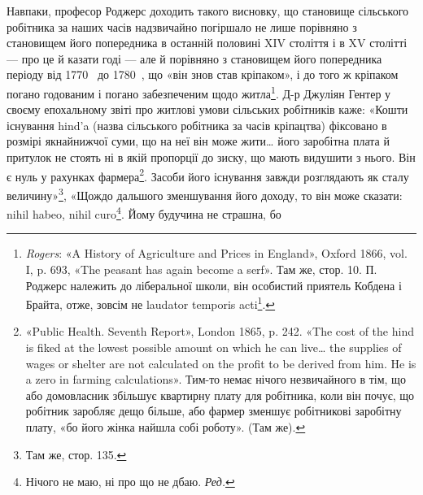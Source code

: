Навпаки, професор Роджерс доходить такого висновку, що
становище сільського робітника за наших часів надзвичайно
погіршало не лише порівняно з становищем його попередника
в останній половині XIV століття і в XV столітті — про це й
казати годі — але й порівняно з становищем його попередника
періоду від 1770~ до 1780~, що «він знов став кріпаком», і
до того ж кріпаком погано годованим і погано забезпеченим щодо
житла\footnote{
\emph{Rogers}: «A History of Agriculture and Prices in England», Oxford
1866, vol. I, p. 693, «The peasant has again become a serf». Там же, стор. 10.
П. Роджерс належить до ліберальної школи, він особистий приятель
Кобдена і Брайта, отже, зовсім не laudator temporis acti\footnote*{
— хвалій минулих часів. \emph{Ред.}
}.
}. Д-р Джуліян Гентер у своєму епохальному звіті про
житлові умови сільських робітників каже: «Кошти існування
hind’a (назва сільського робітника за часів кріпацтва) фіксовано
в розмірі якнайнижчої суми, що на неї він може жити\dots{} його
заробітна плата й притулок не стоять ні в якій пропорції до зиску,
що мають видушити з нього. Він є нуль у рахунках фармера\footnote{
«Public Health. Seventh Report», London 1865, p. 242. «The cost of
the hind is fiked at the lowest possible amount on which he can live\dots{} the
supplies of wages or shelter are not calculated on the profit to be derived
from him. He is a zero in farming calculations». Тим-то немає нічого незвичайного
в тім, що або домовласник збільшує квартирну плату для робітника,
коли він почує, що робітник заробляє дещо більше, або фармер
зменшує робітникові заробітну плату, «бо його жінка найшла собі
роботу». (Там же).
}.
Засоби його існування завжди розглядають як сталу величину»\footnote{
Там же, стор. 135.
},
«Щождо дальшого зменшування його доходу, то він може сказати:
nihil habeo, nihil curo\footnote*{
Нічого не маю, ні про що не дбаю. \emph{Ред.}
}. Йому будучина не страшна, бо
\parbreak{}  %

